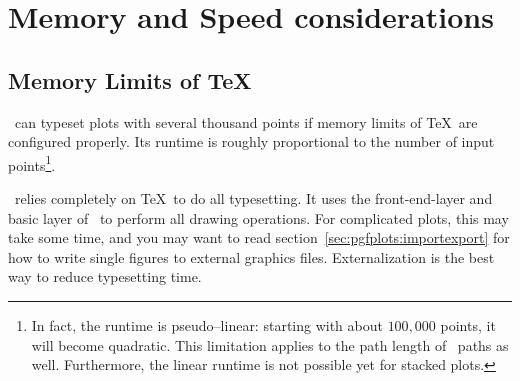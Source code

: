\section{Memory and Speed considerations}
{
%
\subsection{Memory Limits of \TeX}
\label{sec:pgfplots:optimization}
\PGFPlots\ can typeset plots with several thousand points if memory limits of \TeX\ are configured properly. Its runtime is roughly proportional to the number of input points\footnote{In fact, the runtime is pseudo--linear: starting with about $100{,}000$ points, it will become quadratic. This limitation applies to the path length of \PGF\ paths as well. Furthermore, the linear runtime is not possible yet for stacked plots.}.

\pgfplotsexpensiveexample
\begin{codeexample}[]
\end{codeexample}

\pgfplotsexpensiveexample
\begin{codeexample}[]
\end{codeexample}

\PGFPlots\ relies completely on \TeX\ to do all typesetting. It uses the front-end-layer and basic layer of \PGF\ to perform all drawing operations. For complicated plots, this may take some time, and you may want to read section~\ref{sec:pgfplots:importexport} for how to write single figures to external graphics files. Externalization is the best way to reduce typesetting time.

}
